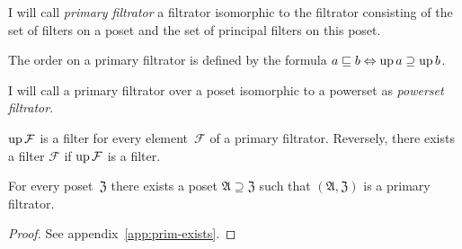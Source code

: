 \begin{defn}
I will call \emph{primary filtrator} a filtrator isomorphic to the
filtrator consisting of the set of filters on a poset and the set
of principal filters on this poset.\end{defn}
\begin{obvious}
The order on a primary filtrator is defined by the formula $a\sqsubseteq b\Leftrightarrow\operatorname{up} a\supseteq\operatorname{up} b$.\end{obvious}
\begin{defn}
I will call a primary filtrator over a
poset isomorphic to a powerset as \emph{powerset filtrator}.\end{defn}
\begin{obvious}
$\operatorname{up}\mathcal{F}$ is a filter for every element~$\mathcal{F}$ of
a primary filtrator. Reversely, there exists a filter $\mathcal{F}$
if $\operatorname{up}\mathcal{F}$ is a filter.\end{obvious}
\begin{thm}
\label{thm1:prim-exists}For every poset~$\mathfrak{Z}$ there exists
a poset $\mathfrak{A}\supseteq\mathfrak{Z}$ such that $(\mathfrak{A},\mathfrak{Z})$
is a primary filtrator.\end{thm}
\begin{proof}
See appendix~\ref{app:prim-exists}.
\end{proof}

